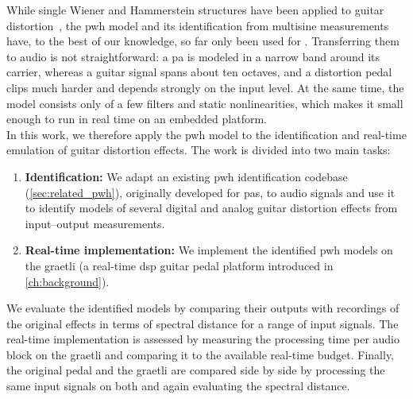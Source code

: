 
While single Wiener and Hammerstein structures have been applied to guitar distortion~\cite{novak2010synchronized, eichas2016blackbox, eichas2018wiener}, the \gls{pwh} model and its identification from multisine measurements have, to the best of our knowledge, so far only been used for . Transferring them to audio is not straightforward: a \gls{pa} is modeled in a narrow band around its carrier, whereas a guitar signal spans about ten octaves, and a distortion pedal clips much harder and depends strongly on the input level. At the same time, the model consists only of a few filters and static nonlinearities, which makes it small enough to run in real time on an embedded platform.\\

In this work, we therefore apply the \gls{pwh} model to the identification
and real-time emulation of guitar distortion effects. The work is divided into
two main tasks:
\begin{enumerate}
  \item \textbf{Identification:} We adapt an existing \gls{pwh} identification
        codebase (\cref{sec:related_pwh}), originally developed for
        \glspl{pa}, to audio signals and use it to identify models of several
        digital and analog guitar distortion effects from input--output
        measurements.
  \item \textbf{Real-time implementation:} We implement the identified
        \gls{pwh} models on the graetli (a real-time \gls{dsp} guitar pedal
        platform introduced in \cref{ch:background}).
\end{enumerate}

We evaluate the identified models by comparing their outputs with recordings
of the original effects in terms of spectral distance for a range of input
signals. The real-time implementation is assessed by measuring the processing
time per audio block on the graetli and comparing it to the available
real-time budget. Finally, the original pedal and the graetli are compared
side by side by processing the same input signals on both and again
evaluating the spectral distance.\\


